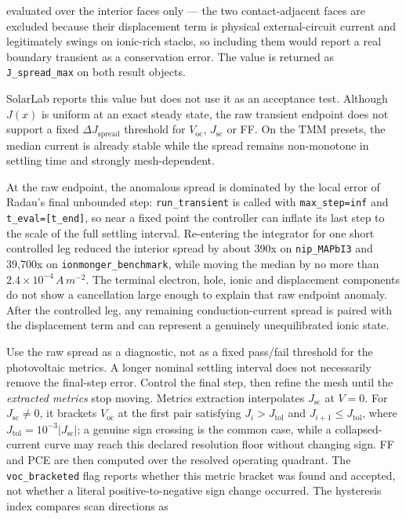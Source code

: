 \documentclass[
  11pt,
  american,
]{report}
\begin{document}
evaluated over the interior faces only --- the two contact-adjacent
faces are excluded because their displacement term is physical
external-circuit current and legitimately swings on ionic-rich stacks,
so including them would report a real boundary transient as a
conservation error. The value is returned as \texttt{J\_spread\_max} on
both result objects.

SolarLab reports this value but does not use it as an acceptance test.
Although \(J(x)\) is uniform at an exact steady state, the raw transient
endpoint does not support a fixed \(\Delta J_\mathrm{spread}\) threshold
for \(V_\mathrm{oc}\), \(J_\mathrm{sc}\) or FF. On the TMM presets, the
median current is already stable while the spread remains non-monotone
in settling time and strongly mesh-dependent.

At the raw endpoint, the anomalous spread is dominated by the local
error of Radau's final unbounded step: \texttt{run\_transient} is called
with \texttt{max\_step=inf} and \texttt{t\_eval={[}t\_end{]}}, so near a
fixed point the controller can inflate its last step to the scale of the
full settling interval. Re-entering the integrator for one short
controlled leg reduced the interior spread by about 390x on
\texttt{nip\_MAPbI3} and 39,700x on \texttt{ionmonger\_benchmark}, while
moving the median by no more than \(2.4\times10^{-4}\,A\,m^{-2}\). The
terminal electron, hole, ionic and displacement components do not show a
cancellation large enough to explain that raw endpoint anomaly. After
the controlled leg, any remaining conduction-current spread is paired
with the displacement term and can represent a genuinely unequilibrated
ionic state.

Use the raw spread as a diagnostic, not as a fixed pass/fail threshold
for the photovoltaic metrics. A longer nominal settling interval does
not necessarily remove the final-step error. Control the final step,
then refine the mesh until the \emph{extracted metrics} stop moving.
Metrics extraction interpolates \(J_\mathrm{sc}\) at \(V=0\). For
\(J_\mathrm{sc}\ne0\), it brackets \(V_\mathrm{oc}\) at the first pair
satisfying \(J_i>J_\mathrm{tol}\) and \(J_{i+1}\le J_\mathrm{tol}\),
where \(J_\mathrm{tol}=10^{-3}|J_\mathrm{sc}|\); a genuine sign crossing
is the common case, while a collapsed-current curve may reach this
declared resolution floor without changing sign. FF and PCE are then
computed over the resolved operating quadrant. The
\texttt{voc\_bracketed} flag reports whether this metric bracket was
found and accepted, not whether a literal positive-to-negative sign
change occurred. The hysteresis index compares scan directions as
\end{document}
